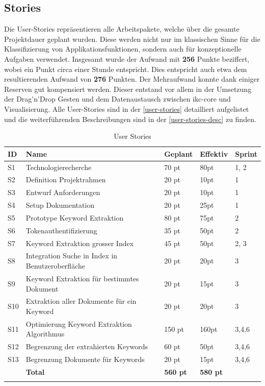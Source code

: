 \subsection{Stories}
Die User-Stories repräsentieren alle Arbeitspakete, welche über die gesamte Projektdauer geplant wurden. Diese werden nicht nur im klassischen Sinne für die Klassifizierung von Applikationsfunktionen, sondern auch für konzeptionelle Aufgaben verwendet. Insgesamt wurde der Aufwand mit \textbf{256} Punkte beziffert, wobei ein Punkt circa einer Stunde entspricht. Dies entspricht auch etwa dem resultierenden Aufwand von \textbf{276} Punkten. Der Mehraufwand konnte dank einiger Reserven gut kompensiert werden. Dieser entstand vor allem in der Umsetzung der \gls{Drag'n'Drop} Gesten und dem Datenaustausch zwischen \gls{ikc-core} und Visualisierung. Alle User-Stories sind in der \autoref{user-stories} detailliert aufgelistet und die weiterführenden Beschreibungen sind in der \autoref{user-stories-desc} zu finden.
\begin{longtable}{|p{0.6cm}|P{4.5cm}|p{1.4cm}|p{1.4cm}|p{2.4cm}|}
\hline
ID  & Name & Geplant & Effektiv &Sprint\\ \hline
S1 & Technologierecherche           & 70 pt             &  80pt              & 1, 2 \\ \hline
S2 & Definition Projektrahmen           & 20 pt             &  10pt              & 1  \\ \hline
S3 & Entwurf Anforderungen           & 20 pt             &  10pt              & 1 \\ \hline
S4 & Setup Dokumentation           & 20 pt             &  25pt              & 1 \\ \hline
S5 & Prototype Keyword Extraktion            & 80 pt             &  75pt              & 2 \\ \hline
S6 & Tokenauthentifizierung           & 35 pt             &  50pt              & 2 \\ \hline
S7 & Keyword Extraktion grosser Index          & 45 pt             &  50pt              & 2, 3 \\ \hline
S8 & Integration Suche in Index in Benutzeroberfläche           & 20 pt             &  20pt             & 3 \\ \hline
S9 & Keyword Extraktion für bestimmtes Dokument         & 20 pt             &  15pt              & 3 \\ \hline
S10 & Extraktion aller Dokumente für ein Keyword       & 20 pt             &  20pt              & 3 \\ \hline
S11 & Optimierung Keyword Extraktion Algorithmus    & 150 pt             &  160pt              & 3,4,6 \\ \hline
S12 & Begrenzung der extrahierten Keywords    & 60 pt             &  50pt              & 3,4,6 \\ \hline
S13 & Begrenzung Dokumente für Keywords    & 20 pt             &  15pt              & 3,4,6 \\ \hline
\hline
 & \textbf{Total}                       & \textbf{560 pt}& \textbf{580 pt}&   \\\hline
    \caption{User Stories}
 \label{user-stories}
\end{longtable}

